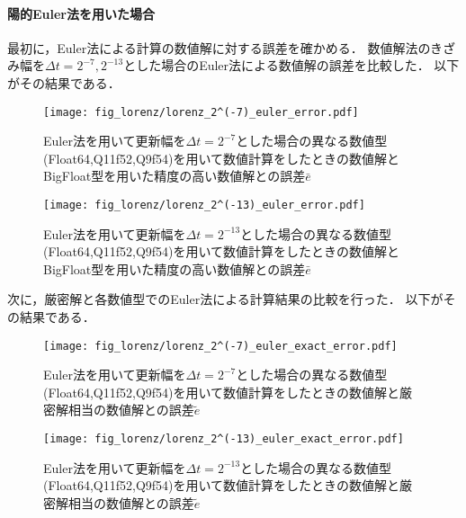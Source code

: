 \paragraph*{陽的Euler法を用いた場合}
最初に，Euler法による計算の数値解に対する誤差を確かめる．
数値解法のきざみ幅を$\Delta t = 2^{-7},2^{-13}$とした場合のEuler法による数値解の誤差を比較した．
以下がその結果である．
\begin{figure}[H]
    \centering
    \begin{minipage}[b]{0.48\columnwidth}
        \centering
        \texttt{[image: fig\_lorenz/lorenz\_2^(-7)\_euler\_error.pdf]}
        \caption{Euler法を用いて更新幅を$\Delta t = 2^{-7}$とした場合の異なる数値型(Float64,Q11f52,Q9f54)を用いて数値計算をしたときの数値解とBigFloat型を用いた精度の高い数値解との誤差$\bar{e}$}
        \label{fig:lorenz_2^(-7)_euler_error}
    \end{minipage}
    \hspace{0.01\columnwidth}
    \begin{minipage}[b]{0.48\columnwidth}
        \centering
        \texttt{[image: fig\_lorenz/lorenz\_2^(-13)\_euler\_error.pdf]}
        \caption{Euler法を用いて更新幅を$\Delta t =  2^{-13}$とした場合の異なる数値型(Float64,Q11f52,Q9f54)を用いて数値計算をしたときの数値解とBigFloat型を用いた精度の高い数値解との誤差$\bar{e}$}
        \label{fig:lorenz_2^(-13)_euler_error}
    \end{minipage}
\end{figure}
次に，厳密解と各数値型でのEuler法による計算結果の比較を行った．
以下がその結果である．
\begin{figure}[H]
    \centering
    \begin{minipage}[b]{0.48\columnwidth}
        \centering
        \texttt{[image: fig\_lorenz/lorenz\_2^(-7)\_euler\_exact\_error.pdf]}
        \caption{Euler法を用いて更新幅を$\Delta t = 2^{-7}$とした場合の異なる数値型(Float64,Q11f52,Q9f54)を用いて数値計算をしたときの数値解と厳密解相当の数値解との誤差$\tilde{e}$}
        \label{fig:lorenz_2^(-7)_euler_exact_error}
    \end{minipage}
    \hspace{0.01\columnwidth}
    \begin{minipage}[b]{0.48\columnwidth}
        \centering
        \texttt{[image: fig\_lorenz/lorenz\_2^(-13)\_euler\_exact\_error.pdf]}
        \caption{Euler法を用いて更新幅を$\Delta t =  2^{-13}$とした場合の異なる数値型(Float64,Q11f52,Q9f54)を用いて数値計算をしたときの数値解と厳密解相当の数値解との誤差$\tilde{e}$}
        \label{fig:lorenz_2^(-13)_euler_exact_error}
    \end{minipage}
\end{figure}

